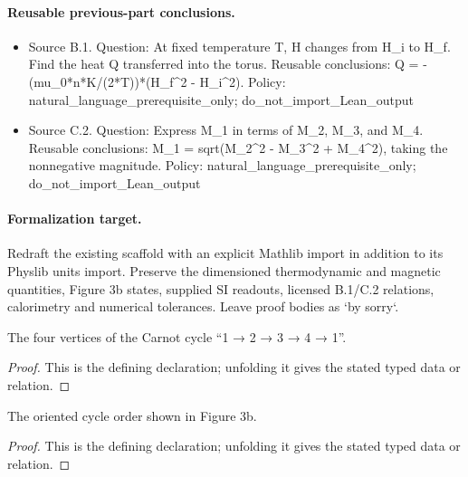 \paragraph{Reusable previous-part conclusions.}
\begin{itemize}
\item Source B.1. Question: At fixed temperature T, H changes from H\_i to H\_f. Find the heat Q transferred into the torus. Reusable conclusions: Q = -(mu\_0*n*K/(2*T))*(H\_f\textasciicircum{}2 - H\_i\textasciicircum{}2). Policy: natural\_language\_prerequisite\_only; do\_not\_import\_Lean\_output
\item Source C.2. Question: Express M\_1 in terms of M\_2, M\_3, and M\_4. Reusable conclusions: M\_1 = sqrt(M\_2\textasciicircum{}2 - M\_3\textasciicircum{}2 + M\_4\textasciicircum{}2), taking the nonnegative magnitude. Policy: natural\_language\_prerequisite\_only; do\_not\_import\_Lean\_output
\end{itemize}

\paragraph{Formalization target.}
Redraft the existing scaffold with an explicit Mathlib import in addition to its
Physlib units import.  Preserve the dimensioned thermodynamic and magnetic
quantities, Figure 3b states, supplied SI readouts, licensed B.1/C.2 relations,
calorimetry and numerical tolerances.  Leave proof bodies as `by sorry`.

\begin{definition}[CarnotState]
  \label{decl:physics:IPhO_2026_3_C_3:CarnotState}
  The four vertices of the Carnot cycle “1 → 2 → 3 → 4 → 1”.
\end{definition}
\begin{proof}
  This is the defining declaration; unfolding it gives the stated typed data or relation.
\end{proof}

\begin{definition}
  \label{decl:physics:IPhO_2026_3_C_3:CarnotState:next}
  The oriented cycle order shown in Figure 3b.
\end{definition}
\begin{proof}
  This is the defining declaration; unfolding it gives the stated typed data or relation.
\end{proof}

